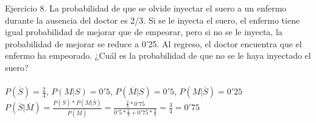 
Ejercicio 8. La probabilidad de que se olvide inyectar el suero a un enfermo durante la ausencia del doctor es 2/3. Si se le inyecta el suero, el enfermo tiene igual probabilidad de mejorar que de empeorar, pero si no se le inyecta, la probabilidad de mejorar se reduce a 0'25. Al regreso, el doctor encuentra que el enfermo ha empeorado. ¿Cuál es la probabilidad de que no se le haya inyectado el suero? \\ \\
$P(\overline{S}) = \frac{2}{3}$, $P(M|S) = 0'5$, $P(\overline{M}|S) = 0'5$, $P(M|\overline{S}) = 0'25$ \\ 
$P(\overline{S}|\overline{M}) = \frac{P(\overline{S})*P(\overline{M}|\overline{S})}{P(\overline{M})} = \frac{\frac{2}{3}*0'75}{0'5*\frac{1}{3}+0'75*\frac{2}{3}}= \frac{3}{4} = 0'75$